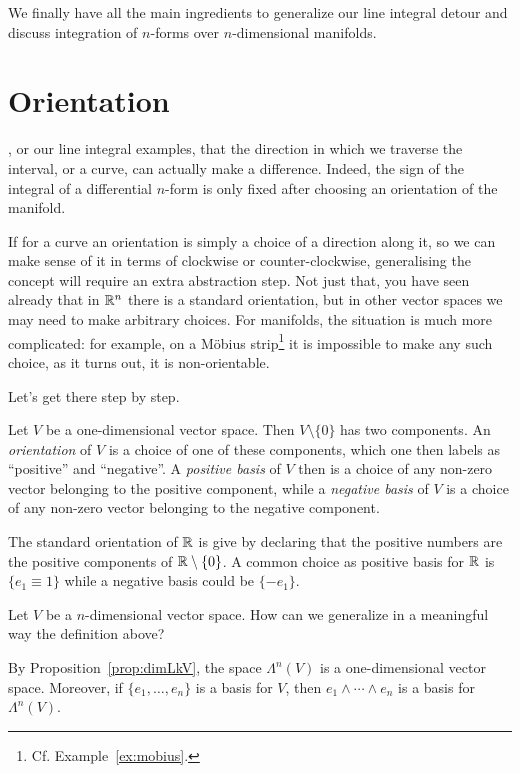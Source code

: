 We finally have all the main ingredients to generalize our line integral detour and discuss integration of $n$-forms over $n$-dimensional manifolds.

\section{Orientation}

, or our line integral examples, that the direction in which we traverse the interval, or a curve, can actually make a difference.
Indeed, the sign of the integral of a differential $n$-form is only fixed after choosing an orientation of the manifold.

If for a curve an orientation is simply a choice of a direction along it, so we can make sense of it in terms of clockwise or counter-clockwise, generalising the concept will require an extra abstraction step.
Not just that, you have seen already that in $\mathbb{R}^n$ there is a standard orientation, but in other vector spaces we may need to make arbitrary choices.
For manifolds, the situation is much more complicated: for example, on a M\"obius strip\footnote{Cf. Example~\ref{ex:mobius}.} it is impossible to make any such choice, as it turns out, it is non-orientable.

Let's get there step by step.

\begin{definition}
  Let $V$ be a one-dimensional vector space. Then $V\setminus\{0\}$ has two components.
  An \emph{orientation} of $V$ is a choice of one of these components, which one then labels as ``positive'' and ``negative''.
  A \emph{positive basis} of $V$ then is a choice of any non-zero vector belonging to the positive component, while a \emph{negative basis} of $V$ is a choice of any non-zero vector belonging to the negative component.
\end{definition}

\begin{example}
  The standard orientation of $\mathbb{R}$ is give by declaring that the positive numbers are the positive components of $\mathbb{R}\setminus\{0\}$.
  A common choice as positive basis for $\mathbb{R}$ is $\{e_1 \equiv 1\}$ while a negative basis could be $\{-e_1\}$.
\end{example}

Let $V$ be a $n$-dimensional vector space.
How can we generalize in a meaningful way the definition above?

By Proposition~\eqref{prop:dimLkV}, the space $\Lambda^n(V)$ is a one-dimensional vector space.
Moreover, if $\{e_1,\ldots,e_n\}$ is a basis for $V$, then $e_1\wedge\cdots\wedge e_n$ is a basis for $\Lambda^n(V)$.

